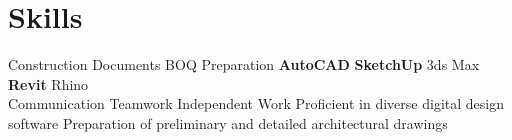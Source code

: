 \documentclass[]{ats-pass-ai-openfront}
\begin{document}
\newcommand{\skillsVSpace}{\vspace{7pt}\\}
\newcommand{\entryVSpace}{%
  \par\vspace{10pt}
}
\newcommand{\betweenProjectsVSpace}{\vspace{10pt}}
\newcommand{\betweensummaryPointsVSpace}{\vspace{5pt}}

\lastupdated



\begin{minipage}[t]{0.34\textwidth}
    
  
  

    \section{Skills} 
      Construction Documents \textbullet{} BOQ Preparation \textbullet{} \textbf{AutoCAD} \textbullet{} \textbf{SketchUp} \textbullet{} 3ds Max \textbullet{} \textbf{Revit} \textbullet{} Rhino \textbullet{} 
    \skillsVSpace

      Communication \textbullet{} Teamwork \textbullet{} Independent Work \textbullet{} Proficient in diverse digital design software \textbullet{} Preparation of preliminary and detailed architectural drawings \textbullet{} 
    \skillsVSpace
    \sectionsep

    
    


\end{minipage} \hspace{15pt} 
\begin{minipage}[t]{0.60\textwidth}

  
  

\end{minipage}
\end{document}
